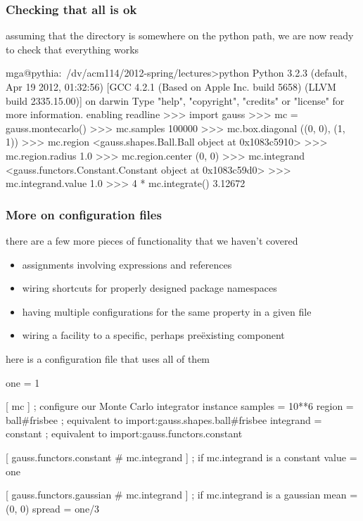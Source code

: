 \begin{frame}[fragile]
%
  \frametitle{Checking that all is ok}
%
  assuming that the directory  is somewhere on the python path, we are now ready
  to check that everything works
%
  \begin{ipython}{}
mga@pythia:~/dv/acm114/2012-spring/lectures>python
Python 3.2.3 (default, Apr 19 2012, 01:32:56) 
[GCC 4.2.1 (Based on Apple Inc. build 5658) (LLVM build 2335.15.00)] on darwin
Type "help", "copyright", "credits" or "license" for more information.
enabling readline
>>> import gauss
>>> mc = gauss.montecarlo()
>>> mc.samples
100000
>>> mc.box.diagonal
((0, 0), (1, 1))
>>> mc.region
<gauss.shapes.Ball.Ball object at 0x1083c5910>
>>> mc.region.radius
1.0
>>> mc.region.center
(0, 0)
>>> mc.integrand
<gauss.functors.Constant.Constant object at 0x1083c59d0>
>>> mc.integrand.value
1.0
>>> 4 * mc.integrate()
3.12672
  \end{ipython}
%
\end{frame}

\begin{frame}[fragile]
%
  \frametitle{More on configuration files}
%
  there are a few more pieces of functionality that we haven't covered
  \begin{itemize}
  \item assignments involving expressions and references
  \item wiring shortcuts for properly designed package namespaces
  \item having multiple configurations for the same property in a given file
  \item wiring a facility to a specific, perhaps pre\"existing component
  \end{itemize}
  here is a configuration file that uses all of them
%
  \begin{icfg}{}
one = 1

[ mc ] ; configure our Monte Carlo integrator instance
samples = 10**6
region = ball#frisbee ; equivalent to import:gauss.shapes.ball#frisbee
integrand = constant ; equivalent to import:gauss.functors.constant

[ gauss.functors.constant # mc.integrand ] ; if mc.integrand is a constant
value = {one}

[ gauss.functors.gaussian # mc.integrand ] ; if mc.integrand is a gaussian
mean = (0, 0)
spread = {one}/3
  \end{icfg}{}
%
\end{frame}


